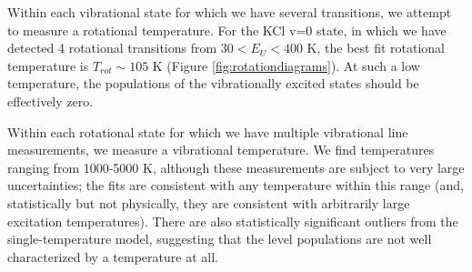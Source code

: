 \documentclass[twocolumn]{aastex62}
\begin{document}



Within each vibrational state for which we have several transitions, we attempt
to measure a rotational temperature.  For the KCl v=0 state, in which we have
detected 4 rotational transitions from $30 < E_U < 400$ K, the best fit
rotational temperature is $T_{rot}\sim105$ K (Figure
\ref{fig:rotationdiagrams}).  At such a low temperature, the populations of the
vibrationally excited states should be effectively zero.  

Within each rotational state for which we have multiple vibrational line
measurements, we measure a vibrational temperature.  We find temperatures
ranging from 1000-5000 K, although these measurements are subject to very large
uncertainties; the fits are consistent with any temperature within this range
(and, statistically but not physically, they are consistent with arbitrarily
large excitation temperatures).  There are also statistically significant
outliers from the single-temperature model, suggesting that the level
populations are not well characterized by a temperature at all.

\end{document}

